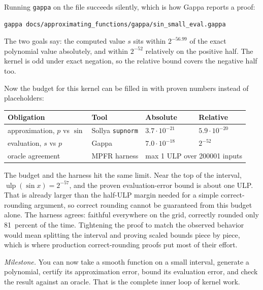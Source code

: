 \documentclass[manuscript, nonacm]{acmart}
\begin{document}
    Running \texttt{gappa} on the file succeeds silently, which is how Gappa
    reports a proof:
    \begin{lstlisting}[style=shell]
gappa docs/approximating_functions/gappa/sin_small_eval.gappa
    \end{lstlisting}
    The two goals say: the computed value $s$ sits within
    $2^{-56.99}$ of the exact polynomial value absolutely, and within
    $2^{-52}$ relatively on the positive half. The kernel is odd under
    exact negation, so the relative bound covers the negative half too.

    Now the budget for this kernel can be filled in with proven numbers
    instead of placeholders:

    \begin{table}[H]
        \centering
        \begin{tabular}{llll}
            \toprule
            Obligation & Tool & Absolute & Relative \\
            \midrule
            approximation, $p$ vs $\sin$ & Sollya \texttt{supnorm}
            & $3.7 \cdot 10^{-21}$ & $5.9 \cdot 10^{-20}$ \\
            evaluation, $s$ vs $p$ & Gappa
            & $7.0 \cdot 10^{-18}$ & $2^{-52}$ \\
            oracle agreement & MPFR harness
            & \multicolumn{2}{l}{max 1 ULP over 200001 inputs} \\
            \bottomrule
        \end{tabular}
    \end{table}

    The budget and the harness hit the same limit. Near the top of the
    interval, $\operatorname{ulp}(\sin x) = 2^{-57}$, and the proven
    evaluation-error bound is about one ULP. That is already larger than the
    half-ULP margin needed for a simple correct-rounding argument, so correct
    rounding cannot be guaranteed from this budget alone. The harness agrees:
    faithful everywhere on the grid, correctly rounded only 81~percent of the
    time. Tightening the proof to match the observed behavior would mean
    splitting the interval and proving scaled bounds piece by piece, which is
    where production correct-rounding proofs put most of their effort.

    \emph{Milestone.}  You can now take a smooth function on a small
    interval, generate a polynomial, certify its approximation error, bound
    its evaluation error, and check the result against an oracle. That is
    the complete inner loop of kernel work.
\end{document}
